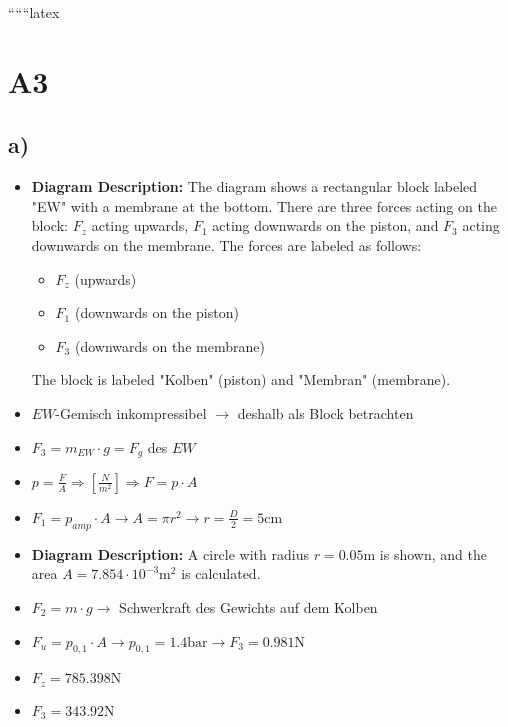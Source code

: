 
``````latex


\section*{A3}
\subsection*{a)}

\begin{itemize}
    \item \textbf{Diagram Description:} The diagram shows a rectangular block labeled "EW" with a membrane at the bottom. There are three forces acting on the block: $F_z$ acting upwards, $F_1$ acting downwards on the piston, and $F_3$ acting downwards on the membrane. The forces are labeled as follows:
    \begin{itemize}
        \item $F_z$ (upwards)
        \item $F_1$ (downwards on the piston)
        \item $F_3$ (downwards on the membrane)
    \end{itemize}
    The block is labeled "Kolben" (piston) and "Membran" (membrane).
\end{itemize}

\begin{itemize}
    \item $EW$-Gemisch inkompressibel $\rightarrow$ deshalb als Block betrachten
    \item $F_3 = m_{EW} \cdot g = F_g$ des $EW$
    \item $p = \frac{F}{A} \Rightarrow \left[ \frac{N}{m^2} \right] \Rightarrow F = p \cdot A$
    \item $F_1 = p_{amp} \cdot A \rightarrow A = \pi r^2 \rightarrow r = \frac{D}{2} = 5 \text{cm}$
    \item \textbf{Diagram Description:} A circle with radius $r = 0.05 \text{m}$ is shown, and the area $A = 7.854 \cdot 10^{-3} \text{m}^2$ is calculated.
    \item $F_2 = m \cdot g \rightarrow$ Schwerkraft des Gewichts auf dem Kolben
    \item $F_u = p_{0,1} \cdot A \rightarrow p_{0,1} = 1.4 \text{bar} \rightarrow F_3 = 0.981 \text{N}$
    \item $F_z = 785.398 \text{N}$
    \item $F_3 = 343.92 \text{N}$
\end{itemize}


